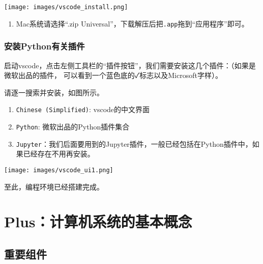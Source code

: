 \documentclass[
  letterpaper,
  DIV=11,
  numbers=noendperiod]{scrreprt}
\providecommand{\tightlist}{%
  \setlength{\itemsep}{0pt}\setlength{\parskip}{0pt}}\usepackage{longtable,booktabs,array}
\begin{document}
\texttt{[image: images/vscode\_install.png]}

\begin{enumerate}
\def\labelenumi{\arabic{enumi}.}
\setcounter{enumi}{1}
\tightlist
\item
  Mac系统请选择``.zip
  Universal''，下载解压后把\texttt{.app}拖到``应用程序''即可。
\end{enumerate}

\hypertarget{ux5b89ux88c5pythonux6709ux5173ux63d2ux4ef6}{%
\subsection{安装Python有关插件}\label{ux5b89ux88c5pythonux6709ux5173ux63d2ux4ef6}}

启动vscode，点击左侧工具栏的``插件按钮''，我们需要安装这几个插件：（如果是微软出品的插件，
可以看到一个蓝色底的✓标志以及Microsoft字样）。

请逐一搜索并安装，如图所示。

\begin{enumerate}
\def\labelenumi{\arabic{enumi}.}
\tightlist
\item
  \texttt{Chinese\ (Simplified)}: vscode的中文界面
\item
  \texttt{Python}: 微软出品的Python插件集合
\item
  \texttt{Jupyter}：我们后面要用到的Jupyter插件，一般已经包括在Python插件中，如果已经存在不用再安装。
\end{enumerate}

\texttt{[image: images/vscode\_ui1.png]}

至此，编程环境已经搭建完成。

\hypertarget{plusux8ba1ux7b97ux673aux7cfbux7edfux7684ux57faux672cux6982ux5ff5}{%
\chapter*{Plus：计算机系统的基本概念}\label{plusux8ba1ux7b97ux673aux7cfbux7edfux7684ux57faux672cux6982ux5ff5}}


\hypertarget{ux91cdux8981ux7ec4ux4ef6}{%
\section*{重要组件}\label{ux91cdux8981ux7ec4ux4ef6}}
\end{document}
